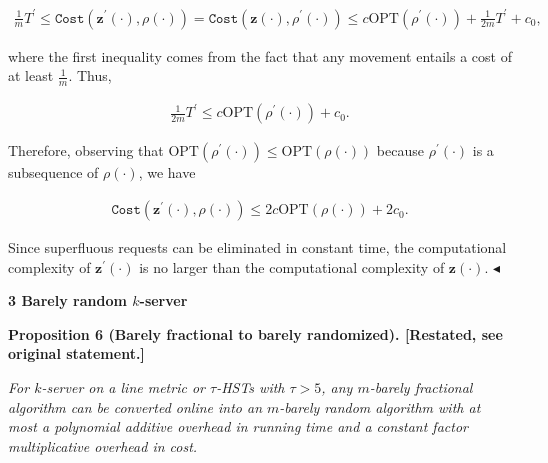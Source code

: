 \[\begin{gathered}
\frac{1}{m}T^{\prime}\leq{\texttt{Cost}}({\mathbf{z}}^{\prime}(\cdot),\rho(\cdot))={\texttt{Cost}}({\mathbf{z}}(\cdot),\rho^{\prime}(\cdot))\leq c{\text{OPT}}(\rho^{\prime}(\cdot))+\frac{1}{2m}T^{\prime}+c_{0},
\end{gathered}\]


where the first inequality comes from the fact that any movement entails a cost of at least $\frac{1}{m}$. Thus,\par


\[\begin{gathered}
\frac{1}{2m}T^{\prime}\leq c{\text{OPT}}(\rho^{\prime}(\cdot))+c_{0}.
\end{gathered}\]


Therefore, observing that ${\text{OPT}}(\rho^{\prime}(\cdot))\leq{\text{OPT}}(\rho(\cdot))$ because $\rho^{\prime}(\cdot)$ is a subsequence of $\rho(\cdot)$, we have\par


\[\begin{gathered}
{\texttt{Cost}}({\mathbf{z}}^{\prime}(\cdot),\rho(\cdot))\leq 2c{\text{OPT}}(\rho(\cdot))+2c_{0}.
\end{gathered}\]


Since superfluous requests can be eliminated in constant time, the computational complexity of ${\mathbf{z}}^{\prime}(\cdot)$ is no larger than the computational complexity of ${\mathbf{z}}(\cdot)$.
$\blacktriangleleft$\par






\par\medskip\noindent\textbf{
3 Barely random $k$-server}\par






\par\medskip\noindent\textbf{
\textbf{Proposition 6}\textbf{ }(Barely fractional to barely randomized)\textbf{.}
[Restated, see original statement.]}\par



\emph{For $k$-server on a line metric
or $\tau$-HSTs with $\tau>5$, any $m$-barely fractional algorithm can be converted online into an $m$-barely random algorithm with at most a polynomial additive overhead in running time and a constant factor multiplicative overhead in cost.}\par



